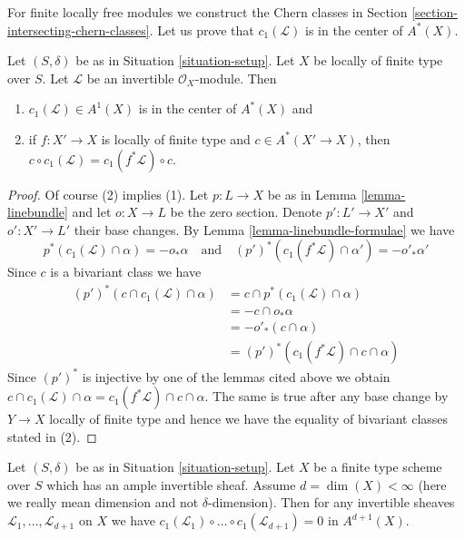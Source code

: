 \noindent
For finite locally free modules we construct the Chern classes in
Section \ref{section-intersecting-chern-classes}.
Let us prove that $c_1(\mathcal{L})$ is in the center of $A^*(X)$.

\begin{lemma}
\label{lemma-c1-center}
Let $(S, \delta)$ be as in Situation \ref{situation-setup}.
Let $X$ be locally of finite type over $S$.
Let $\mathcal{L}$ be an invertible $\mathcal{O}_X$-module.
Then
\begin{enumerate}
\item $c_1(\mathcal{L}) \in A^1(X)$ is in the center of $A^*(X)$ and
\item if $f : X' \to X$ is locally of finite type and $c \in A^*(X' \to X)$,
then $c \circ c_1(\mathcal{L}) = c_1(f^*\mathcal{L}) \circ c$.
\end{enumerate}
\end{lemma}

\begin{proof}
Of course (2) implies (1).
Let $p : L \to X$ be as in Lemma \ref{lemma-linebundle} and let $o : X \to L$
be the zero section. Denote $p' : L' \to X'$ and $o' : X' \to L'$
their base changes. By Lemma \ref{lemma-linebundle-formulae} we have
$$
p^*(c_1(\mathcal{L}) \cap \alpha) = - o_* \alpha
\quad\text{and}\quad
(p')^*(c_1(f^*\mathcal{L}) \cap \alpha') = - o'_* \alpha'
$$
Since $c$ is a bivariant class we have
\begin{align*}
(p')^*(c \cap c_1(\mathcal{L}) \cap \alpha)
& =
c \cap p^*(c_1(\mathcal{L}) \cap \alpha) \\
& =
- c \cap o_* \alpha \\
& =
- o'_*(c \cap \alpha) \\
& =
(p')^*(c_1(f^*\mathcal{L}) \cap c \cap \alpha)
\end{align*}
Since $(p')^*$ is injective by one of the lemmas cited above we obtain
$c \cap c_1(\mathcal{L}) \cap \alpha =
c_1(f^*\mathcal{L}) \cap c \cap \alpha$.
The same is true after any base change by $Y \to X$ locally of finite type
and hence we have the equality of bivariant classes stated in (2).
\end{proof}

\begin{lemma}
\label{lemma-vanish-above-dimension}
Let $(S, \delta)$ be as in Situation \ref{situation-setup}. Let $X$ be a
finite type scheme over $S$ which has an ample invertible sheaf.
Assume $d = \dim(X) < \infty$ (here we really mean dimension and
not $\delta$-dimension).
Then for any invertible sheaves $\mathcal{L}_1, \ldots, \mathcal{L}_{d + 1}$
on $X$ we have
$c_1(\mathcal{L}_1) \circ \ldots \circ c_1(\mathcal{L}_{d + 1}) = 0$
in $A^{d + 1}(X)$.
\end{lemma}


